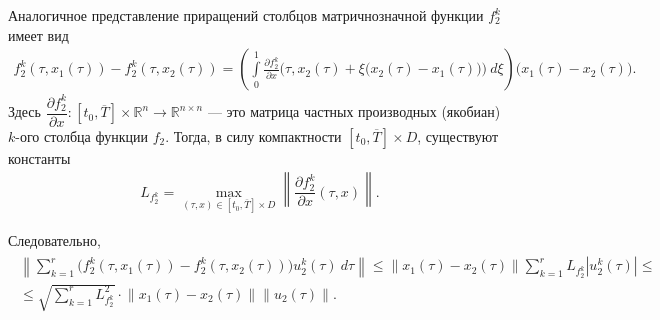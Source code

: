 \documentclass[../main.tex]{subfiles}
\begin{document}
Аналогичное представление приращений столбцов матричнозначной функции $f_2^k$ имеет вид
\begin{gather}\label{s1:meanvalue_f2}
 f_2^k(\tau, x_1(\tau)) 
 - 
 f_2^k(\tau, x_2(\tau)) 
 = \left(
 \int\limits_0^1 
 \frac{\partial f_2^k}{\partial x} \Big(\tau, x_2(\tau) + \xi \big(x_2(\tau) - x_1(\tau)\big)\Big) 
 \ d\xi \right) 
 \big(x_1(\tau) - x_2(\tau)\big).
\end{gather}
Здесь $\dfrac{\partial f_2^k}{\partial x}: [t_0, \overline{T}] \times \mathbb{R}^n \rightarrow \mathbb{R}^{n \times n} $ --- это матрица частных производных (якобиан) $k$-ого столбца функции $f_2$. 
Тогда, в силу компактности $[t_0, \overline{T}] \times D$, существуют константы 
\begin{gather*}
	L_{f_2^k} = \max\limits_{(\tau, x ) \in [t_0, \overline{T}] \times D} \left\| \dfrac{\partial f_2^k}{\partial x} (\tau, x) \right\|.
\end{gather*}
 
Следовательно, 
\begin{gather}\label{s1:lip_f2}
	\begin{gathered}
	\left\|
	 \sum\limits_{k = 1}^{r}
	\Big( f_2^k(\tau, x_1(\tau)) - f_2^k(\tau, x_2(\tau)) \Big) u_2^k(\tau) \ d\tau 
	\right\| 
	\leqslant
	\left\|
	x_1(\tau) - x_2(\tau)
	\right\|
	 \sum\limits_{k = 1}^{r} 
	 L_{f_2^k}
	 \left|
	 u_2^k(\tau)
	 \right|
	 \leqslant \\ \leqslant 
	 \sqrt{\sum_{k=1}^r L_{f_2^k}^2} \cdot
	 \left\|
	 x_1(\tau) - x_2(\tau)
	 \right\| 
	 \| u_2(\tau) \|.
	 \end{gathered}
\end{gather}
 
\end{document}
